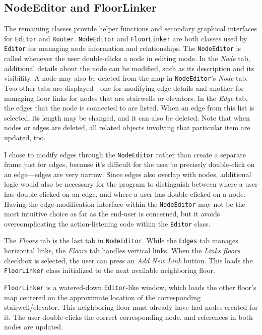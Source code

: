 \documentclass[12pt,letterpaper,titlepage]{article}   %
\begin{document}
\subsection{NodeEditor and FloorLinker}

The remaining classes provide helper functions and secondary graphical
interfaces for \texttt{Editor} and \texttt{Router}. \texttt{NodeEditor} and
\texttt{FloorLinker} are both
classes used by \texttt{Editor} for managing node information and
relationships. The \texttt{NodeEditor} is called whenever the user
double-clicks a node in
editing mode. In the \emph{Node} tab, additional details about the node can be
modified, such as its description and its visibility. A node may also be
deleted from the map in \texttt{NodeEditor}'s \emph{Node} tab. Two other
tabs are displayed---one for modifying edge details and another for managing
floor links for nodes that are stairwells or elevators. In the \emph{Edge} tab,
the edges that the node is connected to are listed. When an edge from
this list is selected, its length may be changed, and it can also be
deleted. Note that when nodes or edges are deleted, all related objects
involving that particular item are updated, too.

I chose to modify edges through the \texttt{NodeEditor} rather than create a
separate frame just for edges, because it's difficult for the user to
precisely double-click on an edge---edges are very narrow. Since edges
also overlap with nodes, additional logic would also be necessary for
the program to distinguish between where a user has double-clicked on an
edge, and where a user has double-clicked on a node. Having the
edge-modification interface within the \texttt{NodeEditor} may not be the most
intuitive choice as far as the end-user is concerned, but it avoids
overcomplicating the action-listening code within the \texttt{Editor} class. 

The \emph{Floors} tab is the last tab in \texttt{NodeEditor}. While the 
\texttt{Edges} tab
manages horizontal links, the \emph{Floors} tab handles vertical links. When
the \emph{Links floors} checkbox is selected, the user can press an \emph{Add
New Link} button. This loads the \texttt{FloorLinker} class initialized to the
next available neighboring floor.

\texttt{FloorLinker} is a watered-down \texttt{Editor}-like window, which
loads the other
floor's map centered on the approximate location of the corresponding
stairwell/elevator. This neighboring floor must already have had nodes
created for it. The user double-clicks the correct corresponding node,
and references in both nodes are updated. 
\end{document}
